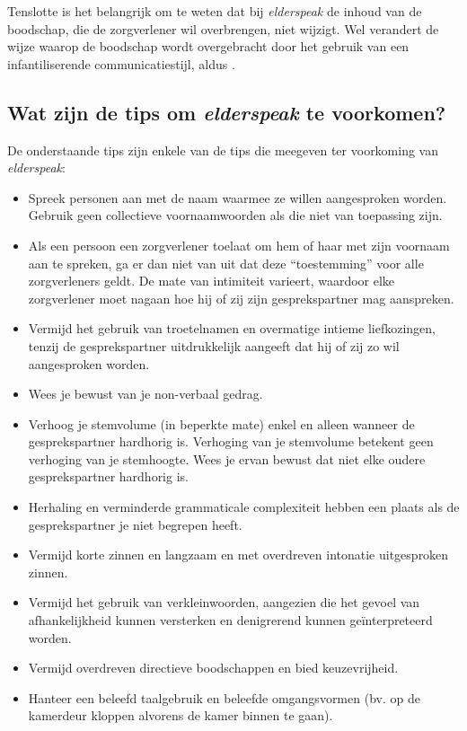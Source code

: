 Tenslotte is het belangrijk om te weten dat bij \textit{elderspeak} de inhoud van de boodschap, die de zorgverlener wil overbrengen, niet wijzigt. Wel verandert de wijze waarop de boodschap wordt overgebracht door het gebruik van een infantiliserende communicatiestijl, aldus \textcite{Campens2021}.

\subsection{Wat zijn de tips om \textit{elderspeak} te voorkomen?}

De onderstaande tips zijn enkele van de tips die \textcite{Wick2007} meegeven ter voorkoming van \textit{elderspeak}:

\begin{itemize}
    \item Spreek personen aan met de naam waarmee ze willen aangesproken worden. Gebruik geen collectieve voornaamwoorden als die niet van toepassing zijn.
    \item Als een persoon een zorgverlener toelaat om hem of haar met zijn voornaam aan te spreken, ga er dan niet van uit dat deze “toestemming” voor alle zorgverleners geldt. De mate van intimiteit varieert, waardoor elke zorgverlener moet nagaan hoe hij of zij zijn gesprekspartner mag aanspreken.
    \item Vermijd het gebruik van troetelnamen en overmatige intieme liefkozingen, tenzij de gesprekspartner uitdrukkelijk aangeeft dat hij of zij zo wil aangesproken worden.
    \item Wees je bewust van je non-verbaal gedrag.
    \item Verhoog je stemvolume (in beperkte mate) enkel en alleen wanneer de gesprekspartner hardhorig is. Verhoging van je stemvolume betekent geen verhoging van je stemhoogte. Wees je ervan bewust dat niet elke oudere gesprekspartner hardhorig is.
    \item Herhaling en verminderde grammaticale complexiteit hebben een plaats als de gesprekspartner je niet begrepen heeft.
    \item Vermijd korte zinnen en langzaam en met overdreven intonatie uitgesproken zinnen.
    \item Vermijd het gebruik van verkleinwoorden, aangezien die het gevoel van afhankelijkheid kunnen versterken en denigrerend kunnen geïnterpreteerd worden.
    \item Vermijd overdreven directieve boodschappen en bied keuzevrijheid.
    \item Hanteer een beleefd taalgebruik en beleefde omgangsvormen (bv. op de kamerdeur kloppen alvorens de kamer binnen te gaan).
\end{itemize}

